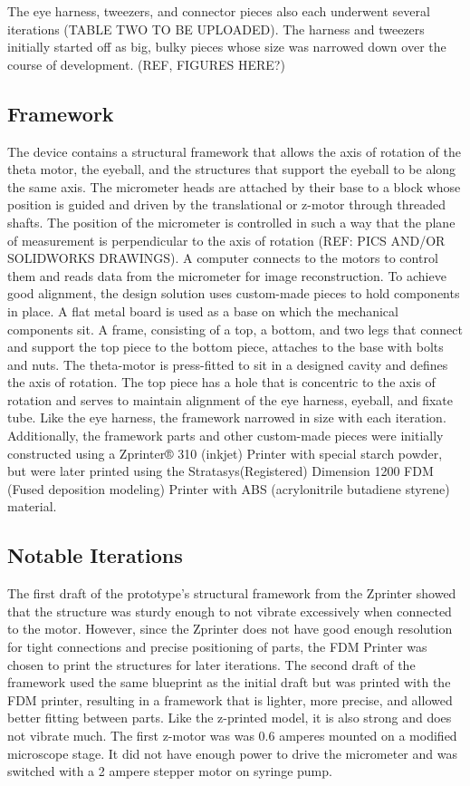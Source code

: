 \documentclass{article}
\begin{document}
The eye harness, tweezers, and connector pieces also each underwent several iterations (TABLE TWO TO BE UPLOADED). The harness and tweezers initially started off as big, bulky pieces whose size was narrowed down over the course of development. (REF, FIGURES HERE?)

\subsection{Framework}
\label{sec:frame}
	The device contains a structural framework that allows the axis of rotation of the theta motor, the eyeball, and the structures that support the eyeball to be along the same axis. The micrometer heads are attached by their base to a block whose position is guided and driven by the translational or z-motor through threaded shafts. The position of the micrometer is controlled in such a way that the plane of measurement is perpendicular to the axis of rotation (REF: PICS AND/OR SOLIDWORKS DRAWINGS). A computer connects to the motors to control them and reads data from the micrometer for image 
reconstruction. 
To achieve good alignment, the design solution uses custom-made pieces to hold components in place. A flat metal board is used as a base on which the mechanical components sit. A frame, consisting of a top, a bottom, and two legs that connect and support the top piece to the bottom piece, attaches to the base with bolts and nuts. The theta-motor is press-fitted to sit in a designed cavity and defines the axis of rotation. The top piece has a hole that is concentric to the axis of rotation and serves to maintain alignment of the eye harness, eyeball, and fixate tube. 
	Like the eye harness, the framework narrowed in size with each iteration. Additionally, the framework parts and other custom-made pieces were initially constructed using a  Zprinter® 310 (inkjet) Printer with special starch powder, but were later printed using the Stratasys(Registered) Dimension 1200 FDM (Fused deposition modeling) Printer with ABS (acrylonitrile butadiene styrene) material. 

\subsection{Notable Iterations}
\label{sec:iterations}

The first draft of the prototype’s structural framework from the Zprinter showed that the structure was sturdy enough to not vibrate excessively when connected to the motor. However, since the Zprinter does not have good enough resolution for tight connections and precise positioning of parts, the FDM Printer was chosen to print the structures for later iterations. The second draft of the framework used the same blueprint as the initial draft but was printed with the FDM printer, resulting in a framework that is lighter, more precise, and allowed better fitting between parts. Like the z-printed model, it is also strong and does not vibrate much. 
	The first z-motor was was 0.6 amperes mounted on a modified microscope stage. It did not have enough power to drive the micrometer and was switched with a 2 ampere stepper motor on syringe pump.
\end{document}
